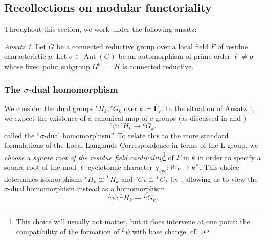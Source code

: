 \documentclass[reqno]{amsart}
\numberwithin{equation}{subsection}
\newcommand{\F}{\mathbf{F}}
\newcommand{\ol}[1]{\overline{#1}}
\newcommand{\co}{\colon}
\newcommand{\ld}{{}^L}
\newcommand{\lc}{{}^c}
\DeclareMathOperator{\cyc}{cyc}
\DeclareMathOperator{\Aut}{Aut}
\theoremstyle{remark}
\newtheorem{ansatz}[thm]{Ansatz}
\numberwithin{equation}{subsection}
\numberwithin{figure}{subsection}
\begin{document}
\subsection{Recollections on modular functoriality}\label{ssec:modular-functoriality} Throughout this section, we work under the following ansatz: 

\begin{ansatz}\label{ansatz:modular-functoriality}
Let $G$ be a connected reductive group over a local field $F$ of residue characteristic $p$. Let $\sigma \in \Aut(G)$ be an automorphism of prime order $\ell \neq p$ whose fixed point subgroup $G^\sigma =: H$ is connected reductive.
\end{ansatz}



\subsubsection{The $\sigma$-dual homomorphism}\label{sssec:sigma-dual-homomorphism}

We consider the dual groups $\lc H_k, \lc G_k$ over $k \coloneqq \ol \F_\ell$. In the situation of Ansatz \ref{ansatz:modular-functoriality}, we expect the existence of a canonical map of $c$-groups (as discussed in \cite[\S 7.8]{TVarxiv} and \cite[\S 5.6]{F24})
\begin{equation}\label{eq:sigma-dual-homomorphism}
\lc \psi \co \lc H_k \rightarrow \lc G_k.
\end{equation}
called the ``$\sigma$-dual homomorphism''. To relate this to the more standard formulations of the Local Langlands Correspondence in terms of the L-group, we \emph{choose a square root of the residue field cardinality}\footnote{This choice will usually not matter, but it does intervene at one point: the compatibility of the formation of $\ld \psi$ with base change, cf.\ \cite[Remark~5.2.3]{CF26a}.} of $F$ in $k$ in order to specify a square root of the mod-$\ell$ cyclotomic character $\chi_{\cyc} \co W_F \rightarrow k^\times$. This choice determines isomorphisms $\lc H_k \cong \ld H_k$ and $\lc G_k \cong \ld G_k$ by \cite[Lemma 5.5.7]{Zhu17a}, allowing us to view the $\sigma$-dual homomorphism instead as a homomorphism
\begin{equation}\label{eq:l-group-sigma-dual-homomorphism}
\ld \psi \co \ld H_k \rightarrow \ld G_k.
\end{equation}
\end{document}

